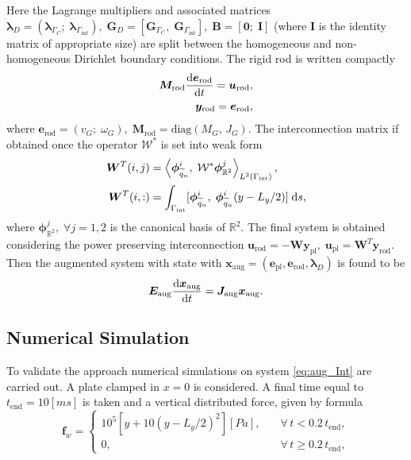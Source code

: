 \documentclass[letterpaper, 10 pt, conference]{ieeeconf}
\begin{document}
Here the Lagrange multipliers and associated matrices $\bm{\lambda}_D =  (\bm\lambda_{\Gamma_{C}}; \; \bm\lambda_{\Gamma_{\text{int}}} ), \; \bm{G}_D = [\bm{G}_{\Gamma_{C}}, \; \bm{G}_{\Gamma_{\text{int}}}], \; \bm{B} = [\bm{0}; \; \bm{I}]$ (where $\bm{I}$ is the identity matrix of appropriate size) are split between the homogeneous and non-homogeneous Dirichlet boundary conditions. The rigid rod is written compactly 
\begin{equation}
\begin{aligned}
\bm{M}_{\text{rod}} \diff{\bm{e}_{\text{rod}}}{t} = \bm{u}_{\text{rod}}, \\
\bm{y}_{\text{rod}} = \bm{e}_{\text{rod}},
\end{aligned}
\end{equation}
where $\bm{e}_{\text{rod}} = (v_G; \; \omega_{G}), \; \bm{M}_{\text{rod}} = \mathrm{diag}(M_G, \, J_G)$. The interconnection matrix if obtained once the operator $\mathcal{W}^*$ is set into weak form
\begin{align*}
\bm{W}^T(i,j) &= \left\langle \bm{\phi}^i_{\widetilde{q}_n}, \; \mathcal{W}^* \bm{\phi}^j_{\mathbb{R}^2} \right\rangle_{L^2(\Gamma_{\text{int}})}, \\
\bm{W}^T(i,:) &= \int_{\Gamma_{\text{int}}} [\bm{\phi}^i_{\widetilde{q}_n}, \; \bm{\phi}^i_{\widetilde{q}_n} (y - L_y/2) ]\d{s},
\end{align*}
where $\bm{\phi}^j_{\mathbb{R}^2},  \; \forall j = 1,2$ is the canonical basis of $\mathbb{R}^2$. The final system is obtained considering the power preserving interconnection $\bm{u}_{\text{rod}} = - \bm{W} \bm{y}_{\text{pl}}, \; \bm{u}_{\text{pl}} = \bm{W}^T \bm{y}_{\text{rod}}$. Then the augmented system with state with $\bm{x}_{\text{aug}} = (\bm{e}_{\text{pl}}, \bm{e}_{\text{rod}}, \bm{\lambda}_D)$ is found to be
\begin{equation} \label{eq:aug_Int}
\bm{E}_{\text{aug}} \diff{\bm{x}_{\text{aug}}}{t} = \bm{J}_{\text{aug}}\bm{x}_{\text{aug}}.
\end{equation}
\subsection{Numerical Simulation}
To validate the approach numerical simulations on system \eqref{eq:aug_Int} are carried out. A  plate clamped in $x=0$ is considered. A final time equal to $t_{\text{end}} = 10 [ms]$ is taken and a vertical distributed force, given by formula
\begin{equation}\label{eq:force_rod}
\bm{f}_w = \begin{cases}
10^5 \left[ y + 10 \left( y - L_y/2 \right)^2 \right] [Pa], \quad &\forall \, t < 0.2 \, t_{\text{end}}, \\
0, \quad &\forall \, t \ge 0.2 \, t_{\text{end}},
\end{cases}
\end{equation}
\end{document}
